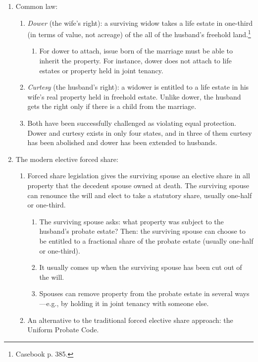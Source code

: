 \begin{enumerate}
    \item Common law:
    \begin{enumerate}
        \item \emph{Dower} (the wife's right): a surviving widow takes a life 
        estate in one-third (in terms of value, not acreage) of the all of the 
        husband's freehold land.\footnote{Casebook p. 385.}
        \begin{enumerate}
            \item For dower to attach, issue born of the marriage must be able 
            to inherit the property. For instance, dower does not attach to 
            life estates or property held in joint tenancy.
        \end{enumerate}
        \item \emph{Curtesy} (the husband's right): a widower is entitled to a 
        life estate in his wife's real property held in freehold estate. 
        Unlike dower, the husband gets the right only if there is a child from 
        the marriage.
        \item Both have been successfully challenged as violating equal 
        protection. Dower and curtesy exists in only four states, and in three 
        of them curtesy has been abolished and dower has been extended to 
        husbands.
    \end{enumerate}
    \item The modern elective forced share:
    \begin{enumerate}
        \item Forced share legislation gives the surviving spouse an elective 
        share in all property that the decedent spouse owned at death. 
        The surviving spouse can renounce the will and elect to take a 
        statutory share, usually one-half or one-third.
        \begin{enumerate}
            \item The surviving spouse asks: what property was subject to the 
            husband's probate estate? Then: the surviving spouse can choose to 
            be entitled to a fractional share of the probate estate (usually 
            one-half or one-third).
            \item It usually comes up when the surviving spouse has been cut 
            out of the will.
            \item Spouses can remove property from the probate estate in 
            several ways---e.g., by holding it in joint tenancy with someone 
            else.
        \end{enumerate}
        \item An alternative to the traditional forced elective share 
        approach: the Uniform Probate Code.
    \end{enumerate}
\end{enumerate}

